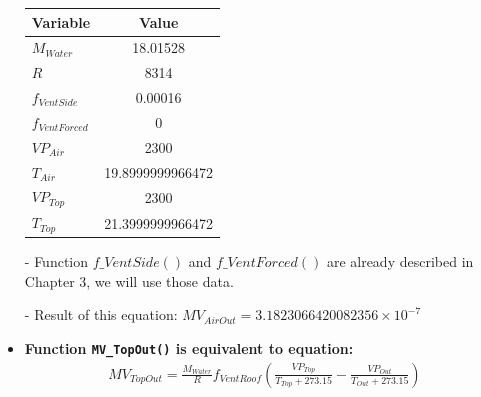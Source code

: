 \documentclass[a4paper]{article}
\numberwithin{equation}{section}
\begin{document}
\begin{itemize}
        \begin{table}[H]
          \centering
          \begin{tabular}{@{}lS[table-format=4.13]@{}}
            \toprule
            \textbf{Variable}  & \textbf{Value}   \\
            \midrule
            \( M_{Water} \)      & 18.01528         \\
            \( R \)              & 8314             \\
            \( f_{VentSide} \)   & 0.00016          \\
            \( f_{VentForced} \) & 0                \\
            \( VP_{Air} \)       & 2300             \\
            \( T_{Air} \)        & 19.8999999966472 \\
            \( VP_{Top} \)       & 2300             \\
            \( T_{Top} \)        & 21.3999999966472 \\
            \bottomrule
          \end{tabular}
        \end{table}
  \item [-] Function \hyperref[fVentSide]{\underline{\( f\_VentSide() \)}} and \hyperref[fVentForced]{\underline{\( f\_VentForced() \)}} are already described in Chapter 3, we will use those data.
  \item[-] Result of this equation: \( MV_{AirOut} = 3.1823066420082356 \times 10^{-7} \)

  \item \textbf{Function \texttt{MV\_TopOut()} is equivalent to equation:}
        \begin{align*}
          MV_{TopOut}  = \frac{M_{Water}}{R} f_{VentRoof} (\frac{VP_{Top}}{T_{Top} + 273.15} - \frac{VP_{Out}}{T_{Out} + 273.15})
        \end{align*}


\end{itemize}
\end{document}
